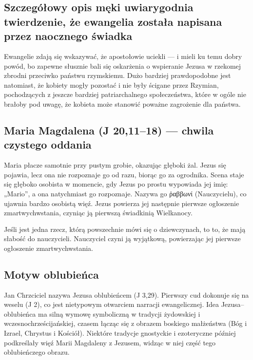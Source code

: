 \subsection{Szczegółowy opis męki uwiarygodnia twierdzenie, że ewangelia została napisana przez naocznego świadka}\label{subsec:the-detailed-description-of-the-passion-seems-to-add-credibility-to-the-claim-that-the-gospel-was-written-by-an-eyewitness-or-at-least-someone-portraying-themselves-as-an-eyewitness.}

Ewangelie zdają się wskazywać, że apostołowie uciekli — i mieli ku temu dobry powód, bo zapewne słusznie bali się oskarżenia o wspieranie Jezusa w rzekomej zbrodni przeciwko państwu rzymskiemu.
Dużo bardziej prawdopodobne jest natomiast, że kobiety mogły pozostać i nie były ścigane przez Rzymian, pochodzących z jeszcze bardziej patriarchalnego społeczeństwa, które w ogóle nie brałoby pod uwagę, że kobieta może stanowić poważne zagrożenie dla państwa.

\subsection{Maria Magdalena (J 20,11--18) --- chwila czystego oddania}\label{subsec:mary-magdalene-john-2011-18-a-moment-of-pure-devotion}

Maria płacze samotnie przy pustym grobie, okazując głęboki żal.
Jezus się pojawia, lecz ona nie rozpoznaje go od razu, biorąc go za ogrodnika.
Scena staje się głęboko osobista w momencie, gdy Jezus po prostu wypowiada jej imię: „Mario”, a ona natychmiast go rozpoznaje.
Nazywa go ῥαββωνί (Nauczycielu), co ujawnia bardzo osobistą więź.
Jezus powierza jej następnie pierwsze ogłoszenie zmartwychwstania, czyniąc ją pierwszą świadkinią Wielkanocy.

Jeśli jest jedna rzecz, którą powszechnie mówi się o dziewczynach, to to, że mają słabość do nauczycieli.
Nauczyciel czyni ją wyjątkową, powierzając jej pierwsze ogłoszenie zmartwychwstania.

\subsection{Motyw oblubieńca}\label{subsec:the-bridegroom-motif}

Jan Chrzciciel nazywa Jezusa oblubieńcem (J 3,29).
Pierwszy cud dokonuje się na weselu (J 2), co jest nietypowym otwarciem narracji ewangelicznej.
Idea Jezusa–oblubieńca ma silną wymowę symboliczną w tradycji żydowskiej i wczesnochrześcijańskiej, czasem łącząc się z obrazem boskiego małżeństwa (Bóg i Izrael, Chrystus i Kościół).
Niektóre tradycje gnostyckie i ezoteryczne później podkreślały więź Marii Magdaleny z Jezusem, widząc w niej część tego oblubieńczego obrazu.

